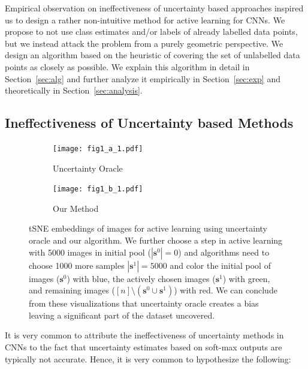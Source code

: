 \documentclass{article}
\begin{document}
Empirical observation on ineffectiveness of uncertainty based approaches inspired us to design a rather non-intuitive method for active learning for CNNs. We propose to not use class estimates and/or labels of already labelled data points, but we instead attack the problem from a purely geometric perspective. We design an algorithm based on the heuristic of covering the set of unlabelled data points as closely as possible. We explain this algorithm in detail in Section~\ref{sec:alg} and further analyze it empirically in Section~\ref{sec:exp} and theoretically in Section~\ref{sec:analysis}.

\subsection{Ineffectiveness of Uncertainty based Methods}



\begin{figure}
\vspace{-10mm}
  \begin{center}
    \begin{subfigure}[b]{0.23\textwidth}
		\texttt{[image: fig1\_a\_1.pdf]}
		\caption{Uncertainty Oracle}
    \end{subfigure}
    \begin{subfigure}[b]{0.23\textwidth}
		\texttt{[image: fig1\_b\_1.pdf]}
		\caption{Our Method}
    \end{subfigure}
\end{center}
{\small
    \caption{tSNE embeddings of images for active learning using uncertainty oracle and our algorithm. We further choose a step in active learning with 5000 images in initial pool ($|\mathbf{s}^0|=0$) and algorithms need to choose 1000 more samples $|\mathbf{s}^1|=5000$ and color the initial pool of images ($\mathbf{s}^0$) with blue, the actively chosen images ($\mathbf{s}^1$) with green, and remaining images ($[n] \setminus (\mathbf{s}^0\cup \mathbf{s}^1)$) with red. We can conclude from these visualizations that uncertainty oracle creates a bias leaving a significant part of the dataset uncovered. }}
\label{sec:whatif}
\vspace{-5mm}
\end{figure}


It is very common to attribute the ineffectiveness of uncertainty methods in CNNs to the fact that uncertainty estimates based on soft-max outputs are typically not accurate. Hence, it is very common to hypothesize the following:
\end{document}
